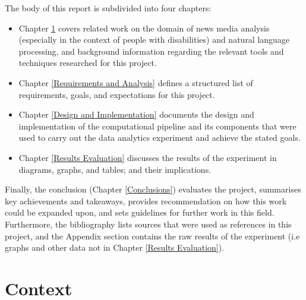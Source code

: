 \documentclass{report}
\begin{document}
The body of this report is subdivided into four chapters:
\begin{itemize}
	\item Chapter \ref{Context} covers related work on the domain of news media analysis (especially in the context of people with disabilities) and natural language processing, and background information regarding the relevant tools and techniques researched for this project.
	\item Chapter \ref{Requirements and Analysis} defines a structured list of requirements, goals, and expectations for this project.
	\item Chapter \ref{Design and Implementation} documents the design and implementation of the computational pipeline and its components that were used to carry out the data analytics experiment and achieve the stated goals.
	\item Chapter \ref{Results Evaluation} discusses the results of the experiment in diagrams, graphs, and tables; and their implications.
\end{itemize}
Finally, the conclusion (Chapter \ref{Conclusions}) evaluates the project, summarises key achievements and takeaways, provides recommendation on how this work could be expanded upon, and sets guidelines for further work in this field.
Furthermore, the bibliography lists sources that were used as references in this project, and the Appendix section contains the raw results of the experiment (i.e graphs and other data not in Chapter \ref{Results Evaluation}).




\chapter{Context} \label{Context} %


\end{document}
